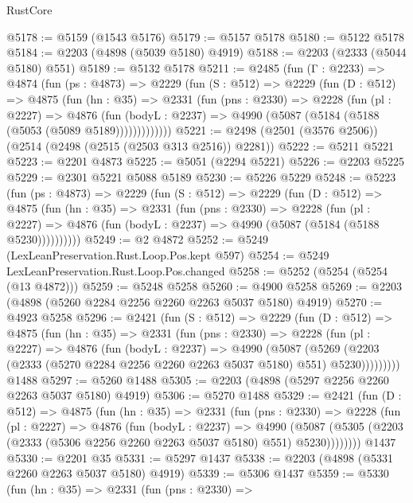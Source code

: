 \begin{lexlean}{RustCore}
\begin{coremodule}
@5178 := @5159 (@1543 @5176)
@5179 := @5157 @5178
@5180 := @5122 @5178
@5184 := @2203 (@4898 (@5039 @5180) @4919)
@5188 := @2203 (@2333 (@5044 @5180) @551)
@5189 := @5132 @5178
@5211 := @2485
    (fun (Γ : @2233) =>
    @4874
      (fun (ps : @4873) =>
      @2229
        (fun (S : @512) =>
        @2229
          (fun (D : @512) =>
          @4875
            (fun (hn : @35) =>
            @2331
              (fun (pns : @2330) =>
              @2228
                (fun (pl : @2227) =>
                @4876
                  (fun (bodyL : @2237) =>
                  @4990 (@5087 (@5184 (@5188 (@5053 (@5089 @5189)))))))))))))
@5221 := @2498 (@2501 (@3576 @2506)) (@2514 (@2498 (@2515 (@2503 @313 @2516)) @2281))
@5222 := @5211 @5221
@5223 := @2201 @4873
@5225 := @5051 (@2294 @5221)
@5226 := @2203 @5225
@5229 := @2301 @5221 @5088 @5189
@5230 := @5226 @5229
@5248 := @5223
    (fun (ps : @4873) =>
    @2229
      (fun (S : @512) =>
      @2229
        (fun (D : @512) =>
        @4875
          (fun (hn : @35) =>
          @2331
            (fun (pns : @2330) =>
            @2228
              (fun (pl : @2227) =>
              @4876 (fun (bodyL : @2237) => @4990 (@5087 (@5184 (@5188 @5230))))))))))
@5249 := @2 @4872
@5252 := @5249 (LexLeanPreservation.Rust.Loop.Pos.kept @597)
@5254 := @5249 LexLeanPreservation.Rust.Loop.Pos.changed
@5258 := @5252 (@5254 (@5254 (@13 @4872)))
@5259 := @5248 @5258
@5260 := @4900 @5258
@5269 := @2203 (@4898 (@5260 @2284 @2256 @2260 @2263 @5037 @5180) @4919)
@5270 := @4923 @5258
@5296 := @2421
    (fun (S : @512) =>
    @2229
      (fun (D : @512) =>
      @4875
        (fun (hn : @35) =>
        @2331
          (fun (pns : @2330) =>
          @2228
            (fun (pl : @2227) =>
            @4876
              (fun (bodyL : @2237) =>
              @4990
                (@5087
                  (@5269
                    (@2203 (@2333 (@5270 @2284 @2256 @2260 @2263 @5037 @5180) @551) @5230)))))))))
    @1488
@5297 := @5260 @1488
@5305 := @2203 (@4898 (@5297 @2256 @2260 @2263 @5037 @5180) @4919)
@5306 := @5270 @1488
@5329 := @2421
    (fun (D : @512) =>
    @4875
      (fun (hn : @35) =>
      @2331
        (fun (pns : @2330) =>
        @2228
          (fun (pl : @2227) =>
          @4876
            (fun (bodyL : @2237) =>
            @4990
              (@5087 (@5305 (@2203 (@2333 (@5306 @2256 @2260 @2263 @5037 @5180) @551) @5230))))))))
    @1437
@5330 := @2201 @35
@5331 := @5297 @1437
@5338 := @2203 (@4898 (@5331 @2260 @2263 @5037 @5180) @4919)
@5339 := @5306 @1437
@5359 := @5330
    (fun (hn : @35) =>
    @2331
      (fun (pns : @2330) =>

\end{coremodule}
\end{lexlean}
